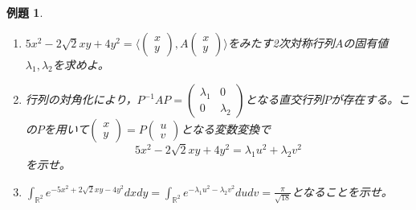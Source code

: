 \documentclass[dvipdfmx,a4j,10pt]{jsarticle}
\theoremstyle{mystyle1}
\newtheorem{exs}[dfn]{例題}
\theoremstyle{mystyle2}
\begin{document}
\begin{framed}
\begin{exs}\
	\begin{enumerate}\renewcommand{\labelenumi}{(\arabic{enumi})}
		\item $\displaystyle 5x^2-2\sqrt{2}xy+4y^2=\langle\begin{pmatrix} x \\ y\end{pmatrix}, A\begin{pmatrix} x \\ y\end{pmatrix}\rangle$をみたす2次対称行列$A$の固有値$\lambda_1,\lambda_2$を求めよ。\footnotemark
		\item 行列の対角化により，$P^{-1}AP=\begin{pmatrix} \lambda_1 & 0 \\ 0 & \lambda_2 \end{pmatrix}$となる直交行列$P$が存在する。この$P$を用いて$\begin{pmatrix} x \\ y\end{pmatrix} = P \begin{pmatrix} u \\ v\end{pmatrix}$となる変数変換で
		\[
			5x^2-2\sqrt{2}xy+4y^2=\lambda_1 u^2+\lambda_2 v^2
		\]
		を示せ。
		\item $\displaystyle \int_{\mathbb{R}^2} e^{-5x^2+2\sqrt{2}xy-4y^2}dxdy= \int_{\mathbb{R}^2} e^{-\lambda_1 u^2-\lambda_2 v^2}dudv=\frac{\pi}{\sqrt{18}}$となることを示せ。
	\end{enumerate}
\end{exs}
\end{framed}

\end{document}
